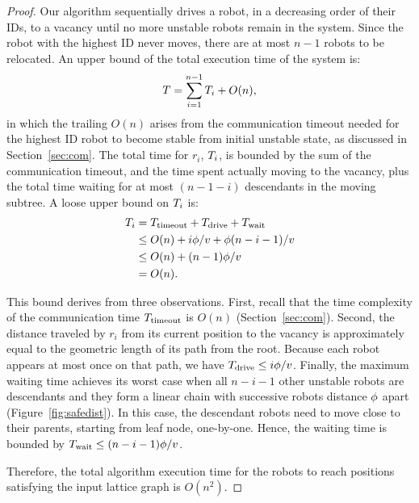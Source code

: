 \begin{proof}
    Our algorithm sequentially drives a robot, in a decreasing order of their IDs, to a vacancy until no more unstable robots remain in the system. 
    Since the robot with the highest ID never moves, there
    are at most $n-1$ robots to be relocated. 
    An upper bound of the
    total execution time of the system is:
      $$ T = \sum\limits_{i=1}^{n-1}T_i + O(n), $$
    in which the trailing $O(n)$ arises from the communication timeout needed
    for the highest ID robot to become stable from initial unstable state, as discussed in Section~\ref{sec:com}.
    The total time for $r_i$, $T_i$, is bounded by the sum of the
    communication timeout, and the time spent actually moving to the vacancy,
    plus the total time waiting for at most $(n-1-i)$ descendants in the moving
    subtree. 
    A loose upper bound on $T_i$ is:
    \begin{equation*}
     \label{eq:timebound}
      \begin{split}
        T_i & = T_{\textrm{timeout}} + T_{\textrm{drive}} + T_{\textrm{wait}}  \\
        & \leq O(n)+ i\phi/v + \phi(n-i-1)/v \\
        & \leq O(n) + (n-1)\phi/v\\
        & = O(n).
      \end{split}
    \end{equation*}
    
    This bound derives from three observations.
    First, recall that the time complexity of the communication time $T_{\textrm{timeout}}$ is $O(n)$ (Section~\ref{sec:com}).  
    Second, the distance traveled by $r_i$ from its current position to the vacancy is
    approximately equal to the geometric length of its path from the root.
    Because each robot appears at most once on that path, we have $T_{\textrm{drive}}\leq i\phi/v$. 
    Finally, the maximum waiting time achieves its
    worst case when all $n-i-1$ other unstable robots are descendants and they
    form a linear chain with successive robots distance $\phi$ apart (Figure~\ref{fig:safedist}).  
    In this case, the descendant robots need to move close to their parents,
    starting from leaf node, one-by-one. 
    Hence, the waiting time is bounded by
    $T_{\textrm{wait}}\leq(n-i-1)\phi/v$.
    
    Therefore, the total algorithm execution time for the robots to reach positions satisfying the input lattice graph
    is $O(n^2)$.
\end{proof}

